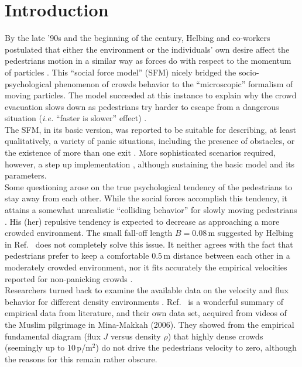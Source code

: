 \section{\label{introduction}Introduction}

By the late '90s and the beginning of the century, Helbing and co-workers 
postulated that either the environment or the individuals' own desire affect 
the pedestrians motion in a similar way as forces do with respect to the 
momentum of particles \cite{Helbing1,Helbing4}. This ``social force model'' 
(SFM) nicely bridged the socio-psychological phenomenon of crowds 
behavior to the ``microscopic'' formalism of moving particles. The model 
succeeded at this instance to explain why the crowd evacuation slows down 
as pedestrians try harder to escape from a dangerous situation 
(\textit{i.e.} ``faster is slower'' effect) \cite{Helbing1,Dorso1,Dorso2}. \\ 

The SFM, in its basic version, was reported to be suitable for describing, 
at least qualitatively, a variety of panic situations, including the presence
of obstacles, or the existence of more than one exit \cite{Dorso3,Dorso5}.
More sophisticated scenarios required, however, a step up implementation
\cite{Dorso4,Dorso6,Cornes1}, although sustaining the basic model and its parameters.  \\

Some questioning arose on the true psychological tendency of the pedestrians to 
stay away from each other. While the social forces accomplish this tendency, it 
attains a somewhat unrealistic ``colliding behavior'' for slowly moving 
pedestrians \cite{Lakoba}. His (her) repulsive tendency is expected to decrease 
as approaching a more crowded environment. The small fall-off length $B=0.08\,$m 
suggested by Helbing in Ref.~\cite{Helbing1} does not completely solve this 
issue. It neither agrees with the fact that pedestrians prefer to keep a 
comfortable $0.5\,$m distance between each other in a moderately crowded 
environment, nor it fits accurately the empirical velocities reported for 
non-panicking crowds \cite{Lakoba}.  \\

Researchers turned back to examine the available data on the velocity and flux 
behavior for different density environments \cite{helbing3,seyfried,seyfried1}. 
Ref.~\cite{helbing3} is a wonderful summary of empirical data from literature, 
and their own data set, acquired from videos of the Muslim pilgrimage in 
Mina-Makkah (2006). They showed from the empirical fundamental diagram (flux $J$ 
versus density $\rho$) that highly dense crowds (seemingly up to $10\,$p/m$^2$) 
do not drive the pedestrians velocity to zero, although the reasons for this 
remain rather obscure.   \\


